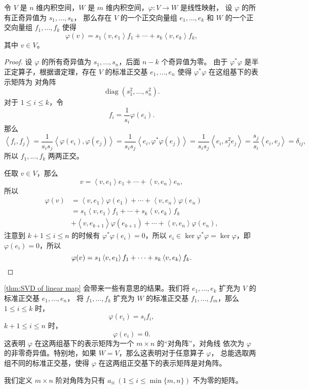 \documentclass[fontset=none,zihao=-4]{Notes}
\DeclareMathOperator\diag{diag}
\newcommand{\inn}[1]{\left\langle#1\right\rangle}
\begin{document}
\begin{theorem}[线性映射的奇异值分解]\label{thm:SVD of linear map}
  令 $V$ 是 $n$ 维内积空间，$W$ 是 $m$ 维内积空间，$\varphi:V\to W$ 是线性映射，
  设 $\varphi$ 的所有正奇异值为 $s_1,\dots,s_k$，
  那么存在 $V$ 的一个正交向量组 $e_1,\dots,e_k$ 和 $W$ 的一个正交向量组
  $f_1,\dots,f_k$ 使得
  \[
    \varphi(v)=s_1\inn{v,e_1}f_1+\cdots+s_k\inn{v,e_k}f_k,  
  \]
  其中 $v\in V$。
\end{theorem}
\begin{proof}
  设 $\varphi$ 的所有奇异值为 $s_1,\dots,s_n$，后面 $n-k$ 个奇异值为零。
  由于 $\varphi^*\varphi$ 是半正定算子，根据谱定理，存在 $V$ 
  的标准正交基 $e_1,\dots,e_n$ 使得 $\varphi^*\varphi$ 在这组基下的表示矩阵为
  对角阵
  \[
    \diag(s_1^2,\dots,s_n^2).  
  \]
  对于 $1\leq i\le k$，令
  \[
    f_i=\frac{1}{s_i}\varphi(e_i).  
  \]
  那么
  \[
    \inn{f_i,f_j}=\frac{1}{s_is_j}\inn{\varphi(e_i),\varphi(e_j)}
    =\frac{1}{s_is_j}\inn{e_i,\varphi^*\varphi(e_j)}=  
    \frac{1}{s_is_j}\inn{e_i,s_j^2e_j}=\frac{s_j}{s_i}\inn{e_i,e_j}
    =\delta_{ij},
  \]
  所以 $f_1,\dots,f_k$ 两两正交。

  任取 $v\in V$，那么
  \[
    v=\inn{v,e_1}e_1+\cdots+\inn{v,e_n}e_n,  
  \]
  所以
  \begin{align*}
    \varphi(v)&=\inn{v,e_1}\varphi(e_1) +\cdots+\inn{v,e_n}\varphi(e_n)\\
    &=s_1\inn{v,e_1}f_1+\cdots+s_k\inn{v,e_k}f_k\\
    &+\inn{v,e_{k+1}}\varphi(e_{k+1})+\cdots+\inn{v,e_n}\varphi(e_n),
  \end{align*}
  注意到 $k+1\leq i\leq n$ 的时候有 $\varphi^*\varphi(e_i)=0$，所以
  $e_i\in\ker\varphi^*\varphi=\ker\varphi$，即 $\varphi(e_i)=0$，所以
  \[
    \varphi(v)=s_1\inn{v,e_1}f_1+\cdots+s_k\inn{v,e_k}f_k.\qedhere
  \]
\end{proof}

\autoref{thm:SVD of linear map} 会带来一些有意思的结果。我们将
$e_1,\dots,e_k$ 扩充为 $V$ 的标准正交基 $e_1,\dots,e_n$，
将 $f_1,\dots,f_k$ 扩充为 $W$ 的标准正交基 $f_1,\dots,f_m$，那么
$1\leq i\leq k$ 时，
\[
  \varphi(e_i)=s_if_i,  
\]
$k+1\leq i\leq n$ 时，
\[
  \varphi(e_i)=0.  
\]
这表明 $\varphi$ 在这两组基下的表示矩阵为一个 $m\times n$ 的“对角阵”，对角线
依次为 $\varphi$ 的非零奇异值。特别地，如果 $W=V$，那么这表明对于任意算子 $\varphi$，
总能选取两组不同的标准正交基，使得 $\varphi$ 在这两组正交基下的表示矩阵是对角阵。

我们定义 $m\times n$ 阶对角阵为只有 $a_{ii}\ (1\leq i\le \min\{m,n\})$ 不为零的矩阵。
\end{document}
